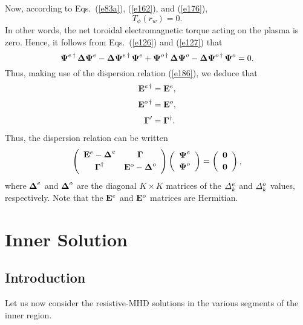 \documentclass[12pt,prb,aps,notitlepage]{revtex4-1}
\newcommand {\bPsi} {\mbox{\boldmath$\Psi$}}
\newcommand {\bDelta} {\mbox{\boldmath$\Delta$}}
\newcommand {\bGamma} {\mbox{\boldmath$\Gamma$}}
\begin{document}
Now, according to Eqs.~(\ref{e83a}), (\ref{e162}), and (\ref{e176}), 
\begin{equation}
T_\phi (r_w) = 0.
\end{equation}
In other words, the net toroidal electromagnetic torque acting on the plasma is zero. 
Hence, it follows from Eqs.~(\ref{e126}) and (\ref{e127}) that 
\begin{equation}
\bPsi^{e\,\dag} \,\bDelta\bPsi^e-\bDelta\bPsi^{e\,\dag} \,\bPsi^e+  \bPsi^{o\,\dag} \,\bDelta\bPsi^o-  \bDelta\bPsi^{o\,\dag} \,\bPsi^o =0. 
\end{equation}
Thus, making use of the dispersion relation (\ref{e186}), we deduce that
\begin{align}
{\bf E}^{e\,\dag} &= {\bf E}^e,\\[0.5ex]
{\bf E}^{o\,\dag} &= {\bf E}^o,\\[0.5ex]
\bGamma' &= \bGamma^\dag.
\end{align}
Thus, the dispersion relation can be written
\begin{equation}
\left(\begin{array}{cc} {\bf E}^e -\bDelta^e& \bGamma\\[0.5ex]
\bGamma^\dag & {\bf E}^o-\bDelta^o\end{array}\right)\left(\begin{array}{c} \bPsi^e\\[0.5ex] \bPsi^o\end{array}\right)=\left(\begin{array}{c} {\bf 0}\\[0.5ex]{\bf 0}\end{array}\right),
\end{equation}
where $\bDelta^e$  and $\bDelta^o$ are the diagonal $K\times K$ matrices of the ${\mit\Delta}^e_k$ and ${\mit\Delta}^o_k$
values, respectively. Note that the ${\bf E}^e$ and ${\bf E}^o$ matrices are Hermitian. 


\section{Inner Solution}
\subsection{Introduction}
Let us now consider the resistive-MHD solutions in the various segments of the inner region.
\end{document}
